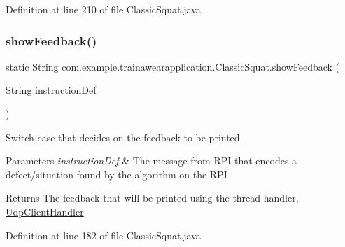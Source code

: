 Definition at line 210 of file Classic\+Squat.\+java.


\begin{DoxyCode}{0}

\end{DoxyCode}
\mbox{\label{classcom_1_1example_1_1trainawearapplication_1_1_classic_squat_a1904cfcfcc9d0e3f1256202a8f7ad33e}} 
\subsubsection{\texorpdfstring{showFeedback()}{showFeedback()}}
{\footnotesize\ttfamily static String com.\+example.\+trainawearapplication.\+Classic\+Squat.\+show\+Feedback (\begin{DoxyParamCaption}\item[{String}]{instruction\+Def }\end{DoxyParamCaption})\hspace{0.3cm}{\ttfamily [static]}}



Switch case that decides on the feedback to be printed. 


\begin{DoxyParams}{Parameters}
{\em instruction\+Def} & The message from R\+PI that encodes a defect/situation found by the algorithm on the R\+PI \\
\hline
\end{DoxyParams}
\begin{DoxyReturn}{Returns}
The feedback that will be printed using the thread handler, \mbox{\hyperlink{classcom_1_1example_1_1trainawearapplication_1_1_udp_client_handler}{Udp\+Client\+Handler}} 
\end{DoxyReturn}


Definition at line 182 of file Classic\+Squat.\+java.


